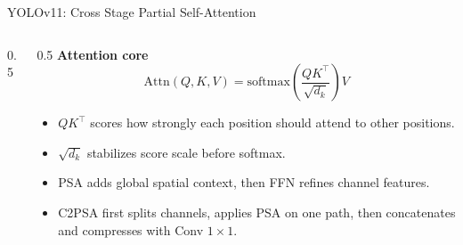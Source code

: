 \begin{frame}{YOLOv11: Cross Stage Partial Self-Attention}
\begin{columns}[T]
\begin{column}{0.5\textwidth}
    \end{column}
    \begin{column}{0.5\textwidth}
      \small
      \textbf{Attention core}
      \[
        \mathrm{Attn}(Q,K,V)=
        \mathrm{softmax}\!\left(
        \frac{QK^\top}{\sqrt{d_k}}
        \right)V
      \]
      \begin{itemize}
        \item $QK^\top$ scores how strongly each position should attend to other positions.
        \item $\sqrt{d_k}$ stabilizes score scale before softmax.
        \item PSA adds global spatial context, then FFN refines channel features.
        \item C2PSA first splits channels, applies PSA on one path, then concatenates and compresses with Conv $1{\times}1$.
      \end{itemize}
    \end{column}
  \end{columns}
\end{frame}

